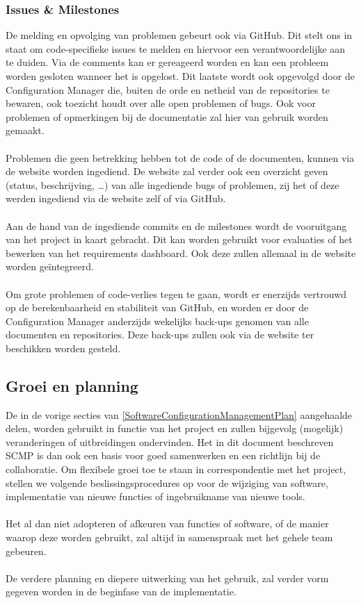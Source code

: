 \subsubsection{Issues \& Milestones}
De melding en opvolging van problemen gebeurt ook via GitHub. Dit stelt ons in staat om code-specifieke issues te melden en hiervoor een verantwoordelijke aan te duiden. Via de comments kan er gereageerd worden en kan een probleem worden gesloten wanneer het is opgelost. Dit laatste wordt ook opgevolgd door de Configuration Manager die, buiten de orde en netheid van de repositories te bewaren, ook toezicht houdt over alle open problemen of bugs. Ook voor problemen of opmerkingen bij de documentatie zal hier van gebruik worden gemaakt.
\\
\\
Problemen die geen betrekking hebben tot de code of de documenten, kunnen via de website worden ingediend. De website zal verder ook een overzicht geven (status, beschrijving, …) van alle ingediende bugs of problemen, zij het of deze werden ingediend via de website zelf of via GitHub.
\\
\\
Aan de hand van de ingediende commits en de milestones wordt de vooruitgang van het project in kaart gebracht. Dit kan worden gebruikt voor evaluaties of het bewerken van het requirements dashboard. Ook deze zullen allemaal in de website worden geïntegreerd.
\\
\\
Om grote problemen of code-verlies tegen te gaan, wordt er enerzijds vertrouwd op de berekenbaarheid en stabiliteit van GitHub, en worden er door de Configuration Manager anderzijds wekelijks back-ups genomen van alle documenten en repositories. Deze back-ups zullen ook via de website ter beschikken worden gesteld.

\subsection{Groei en planning}
De in de vorige secties van \ref{SoftwareConfigurationManagementPlan} aangehaalde delen, worden gebruikt in functie van het project en zullen bijgevolg (mogelijk) veranderingen of uitbreidingen ondervinden. Het in dit document beschreven SCMP is dan ook een basis voor goed samenwerken en een richtlijn bij de collaboratie. Om flexibele groei toe te staan in correspondentie met het project, stellen we volgende beslissingsprocedures op voor de wijziging van software, implementatie van nieuwe functies of ingebruikname van nieuwe tools.
\\
\\
Het al dan niet adopteren of afkeuren van functies of software, of de manier waarop deze worden gebruikt, zal altijd in samenspraak met het gehele team gebeuren.
\\
\\
De verdere planning en diepere uitwerking van het gebruik, zal verder vorm gegeven worden in de beginfase van de implementatie.

